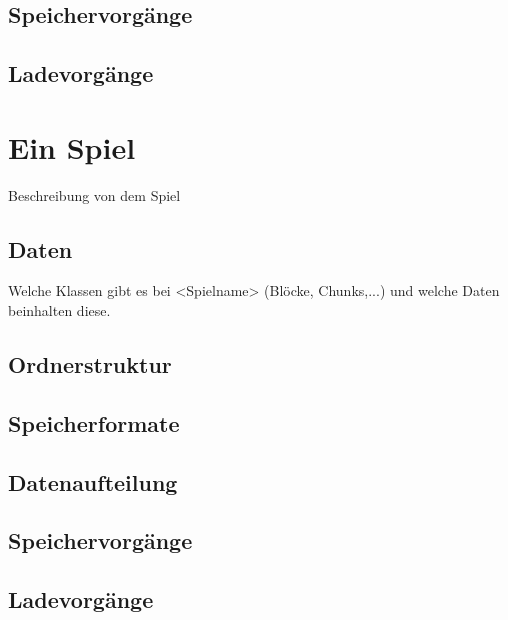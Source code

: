 \subsection{Speichervorgänge}

\subsection{Ladevorgänge} 



\section{Ein Spiel}
Beschreibung von dem Spiel

\subsection{Daten}
Welche Klassen gibt es bei <Spielname> (Blöcke, Chunks,...) und welche Daten 
beinhalten diese.

\subsection{Ordnerstruktur}

\subsection{Speicherformate}

\subsection{Datenaufteilung}

\subsection{Speichervorgänge}

\subsection{Ladevorgänge}
\fi
